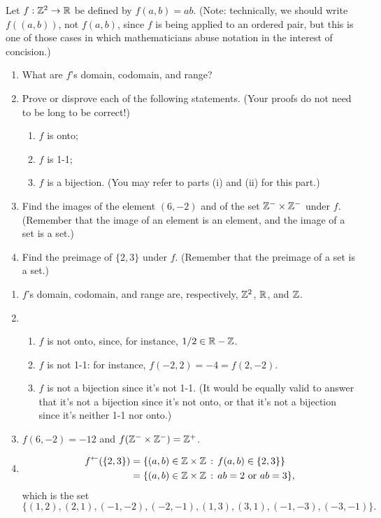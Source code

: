 \begin{exercise}[ID=1D]
Let $f: \mathbb{Z}^2 \to \mathbb{R}$ be defined by $f(a,b)=ab$.  (Note: technically, we should write $f((a,b))$, not $f(a,b)$, since $f$ is being applied to an ordered pair, but this is one of those cases in which mathematicians abuse notation in the interest of concision.)

\begin{enumerate}
\item What are $f$'s domain, codomain, and range?
\item Prove or disprove each of the following statements. (Your proofs do not need to be long to be correct!)
\begin{enumerate}
\item $f$ is onto;
\item $f$ is 1-1;
\item $f$ is a bijection. (You may refer to parts (i) and (ii) for this part.)
\end{enumerate}

\item Find the images of the element $(6,-2)$ and of the set $\mathbb{Z}^- \times \mathbb{Z}^-$ under $f$. (Remember that the image of an element is an element, and the image of a set is a set.)
\item Find the preimage of $\{2,3\}$ under $f$. (Remember that the preimage of a set is a set.)
\end{enumerate}

\end{exercise}

\begin{solution}[print=false]

\begin{enumerate}
\item $f$'s domain, codomain, and range are, respectively, $\mathbb{Z}^2$, $\mathbb{R}$, and $\mathbb{Z}$.

\item
\begin{enumerate}
\item $f$ is not onto, since, for instance, $1/2\in \mathbb{R}-\mathbb{Z}$.
\item $f$ is not 1-1: for instance, $f(-2,2)=-4=f(2,-2)$.
\item $f$ is not a bijection since it's not 1-1. (It would be equally valid to answer that it's not a bijection since it's not onto, or that it's not a bijection since it's neither 1-1 nor onto.)
\end{enumerate}

\item $f(6,-2)=-12$ and $f(\mathbb{Z}^-\times \mathbb{Z}^-)=\mathbb{Z}^+$.

\item
\begin{align*}
f^{\leftarrow}(\{2,3\})&=\{(a,b)\in \mathbb{Z}\times \mathbb{Z}\,:\, f(a,b)\in \{2,3\}\}\\
&=\{(a,b)\in \mathbb{Z}\times \mathbb{Z}\,:\, ab=2 \mbox{ or } ab=3\},
\end{align*}
which is the set
$$\{(1,2),(2,1),(-1,-2),(-2,-1),(1,3),(3,1),(-1,-3),(-3,-1)\}.$$
\end{enumerate}

\end{solution}

